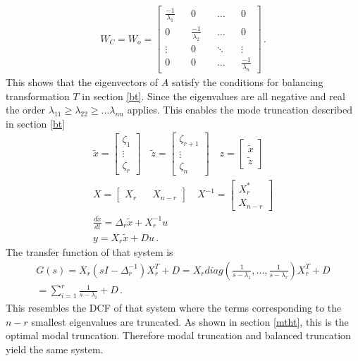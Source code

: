 \begin{gather}
W_C = W_o = \begin{bmatrix}
\frac{-1}{\lambda_1} && 0 && \hdots && 0 \\
0 && \frac{-1}{\lambda_2}&& \hdots && 0 \\
\vdots && 0 && \ddots && \vdots \\
0 && 0 && \hdots && \frac{-1}{\lambda_n}
\end{bmatrix} \,.
\end{gather}
This shows that the eigenvectors of \(A\) satisfy the conditions for balancing transformation \(T\) in section \ref{bt}.
Since the eigenvalues are all negative and real the order \(\lambda_{11} \geq \lambda_{22} \geq ...  \lambda_{nn}\) applies.
This enables the mode truncation described in section \ref{bt}
\begin{gather}
\tilde{x} = \begin{bmatrix}
\zeta_1 \\
\vdots \\
\zeta_r
\end{bmatrix} \quad 
\tilde{z} = \begin{bmatrix}
\zeta_{r+1} \\
\vdots \\
\zeta_n
\end{bmatrix} \quad
z = \begin{bmatrix}
\tilde{x} \\
\tilde{z}
\end{bmatrix}\\
X= \begin{bmatrix}
X_r && X_{n-r}
\end{bmatrix} \quad
X^{-1} = \begin{bmatrix}
X_r^{*} \\
X_{n-r}
\end{bmatrix} \\
\frac{d\tilde{x}}{dt} = \Delta_r \tilde{x} + X^{-1}_ru \\
y = X_r\tilde{x} + Du \,.
\end{gather}
The transfer function of that system is
\begin{gather}
G(s) = X_r(sI - \Delta_r^{-1})X_r^{T}+D = X_r diag(\frac{1}{s-\lambda_1}, ..., \frac{1}{s-\lambda_r})X_r^{T}+D \\
= \sum_{i=1}^{r} \frac{1}{s-\lambda_i} + D \,.
\end{gather}
This resembles the DCF of that system where the terms corresponding to the \(n-r\) smallest eigenvalues are truncated.
As shown in section \ref{mtht}, this is the optimal modal truncation.
Therefore modal truncation and balanced truncation yield the same system.




